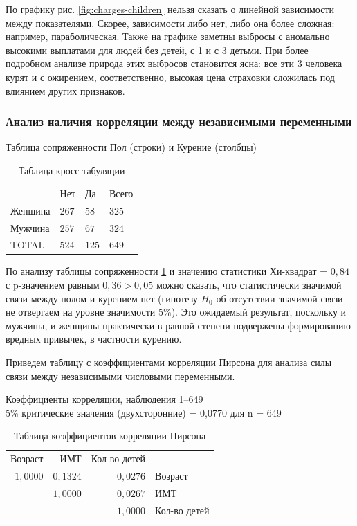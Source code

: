 \documentclass[a4paper,12pt]{article}
\begin{document}
По графику рис. \ref{fig:charges-children} нельзя сказать о линейной зависимости между показателями. Скорее, зависимости либо нет, либо она более сложная: например, параболическая. Также на графике заметны выбросы с аномально высокими выплатами для людей без детей, с 1 и с 3 детьми. При более подробном анализе природа этих выбросов становится ясна: все эти 3 человека курят и с ожирением, соответственно, высокая цена страховки сложилась под влиянием других признаков.

\subsubsection{Анализ наличия корреляции между независимыми переменными}

\begin{table}[H]
	\begin{center}
		Таблица сопряженности Пол (строки) и Курение (столбцы)\\
		
		\vspace{8pt}
		
		\begin{tabular}{llll}
		    & Нет & Да & Всего \\[1ex]
			Женщина & $267$ & $58$ & $325$\\
			Мужчина & $257$ & $67$ & $324$\\[1ex]
			TOTAL & $524$ & $125$ & $649$\\
		\end{tabular}
		\caption{Таблица кросс-табуляции}
		\label{tab:cross}
	\end{center}
\end{table}

По анализу таблицы сопряженности \ref{tab:cross} и значению статистики Хи-квадрат = $0,84$ с p-значением равным $0,36 > 0,05$ можно сказать, что статистически значимой связи между полом и курением нет (гипотезу $H_0$ об отсутствии значимой связи не отвергаем на уровне значимости $5\%$). Это ожидаемый результат, поскольку и мужчины, и женщины практически в равной степени подвержены формированию вредных привычек, в частности курению.

Приведем таблицу с коэффициентами корреляции Пирсона для анализа силы связи между независимыми числовыми переменными. 

\begin{table}[H]
\begin{center}
	Коэффициенты корреляции, наблюдения 1--649\\
	5\% критические значения (двухсторонние) = 0,0770 для n = 649\\
	\vspace{8pt}
	\begin{tabular}{rrrl}
		Возраст & ИМТ & Кол-во детей &\\
		$1,0000$ & $0,1324$ & $0,0276$ & Возраст\\
		& $1,0000$ & $0,0267$ & ИМТ\\
		&  & $1,0000$ & Кол-во детей\\
	\end{tabular}
	\caption{Таблица коэффициентов корреляции Пирсона}
	\label{tab:pris}
\end{center}
\end{table}
\end{document}
